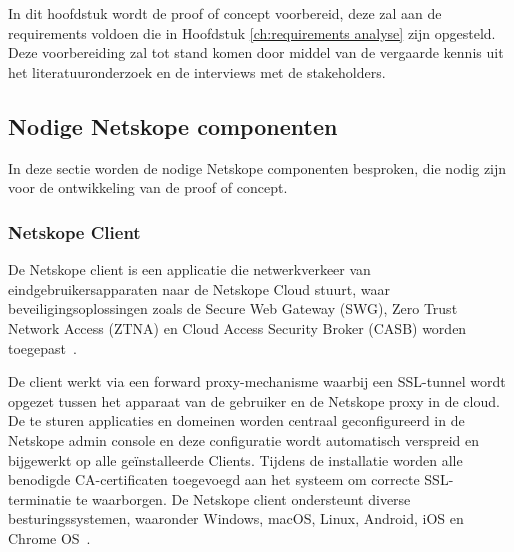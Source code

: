 
\chapter{}%
\label{ch:proof of concept preparation}

In dit hoofdstuk wordt de proof of concept voorbereid, deze zal aan de requirements voldoen die in Hoofdstuk \ref{ch:requirements analyse} zijn opgesteld. Deze voorbereiding zal tot stand komen door middel van de vergaarde kennis uit het literatuuronderzoek en de interviews met de stakeholders.

\section{Nodige Netskope componenten}

In deze sectie worden de nodige Netskope componenten besproken, die nodig zijn voor de ontwikkeling van de proof of concept.

\subsection{Netskope Client}
De Netskope client is een applicatie die netwerkverkeer van eindgebruikersapparaten naar de Netskope Cloud stuurt, waar beveiligingsoplossingen zoals de Secure Web Gateway (SWG), Zero Trust Network Access (ZTNA) en Cloud Access Security Broker (CASB) worden toegepast~\autocite{Netskope2025-8}. 

\vspace{2ex}

De client werkt via een forward proxy-mechanisme waarbij een SSL-tunnel wordt opgezet tussen het apparaat van de gebruiker en de Netskope proxy in de cloud. De te sturen applicaties en domeinen worden centraal geconfigureerd in de Netskope admin console en deze configuratie wordt automatisch verspreid en bijgewerkt op alle geïnstalleerde Clients. Tijdens de installatie worden alle benodigde CA-certificaten toegevoegd aan het systeem om correcte SSL-terminatie te waarborgen.
De Netskope client ondersteunt diverse besturingssystemen, waaronder Windows, macOS, Linux, Android, iOS en Chrome OS~\autocite{Netskope2025-8}.

\vspace{2ex}

